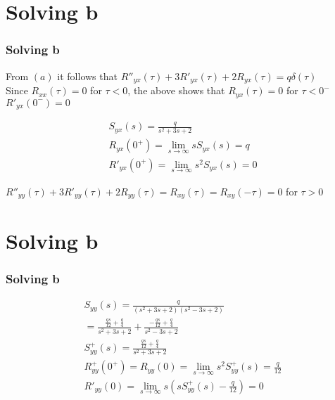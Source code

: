 \documentclass{beamer}
\providecommand{\brak}[1]{\ensuremath{\left(#1\right)}}
\begin{document}
\section{Solving b}
\begin{frame}
\frametitle{Solving b}

From \brak{a} it follows that 
$R''_{yx}\brak{\tau} + 3R'_{yx}\brak{\tau} + 2R_{yx}\brak{\tau} = q\delta\brak{\tau}$\\
Since $R_{xx}\brak{\tau} = 0$ for $\tau < 0$, the above shows that 
$R_{yx}\brak{\tau} = 0$ for $\tau < 0^{-}$ $R'_{yx}\brak{0^{-}} = 0$

\begin{align}
    S_{yx}\brak{s} = \frac{q}{s^{2} + 3s + 2}\\
R_{yx}\brak{0^{+}} = \lim\limits_{s \to \infty} s S_{yx}\brak{s} = q\\
R'_{yx}\brak{0^{+}} = \lim\limits_{s \to \infty} s^{2} S_{yx}\brak{s} = 0
\end{align}

$R''_{yy}\brak{\tau} + 3R'_{yy}\brak{\tau} + 2R_{yy}\brak{\tau} = R_{xy}\brak{\tau} = R_{xy}\brak{-\tau} = 0$ for $\tau > 0$

\end{frame}

\section{Solving b}
\begin{frame}
\frametitle{Solving b}
\begin{align}
    S_{yy}\brak{s} = \frac{q}{\brak{s^{2}+ 3s + 2}\brak{s^{2} - 3s + 2}}\\
    = \frac{\frac{qs}{12} + \frac{q}{4}}{s^{2} + 3s + 2} + \frac{-\frac{qs}{12} + \frac{q}{4}}{s^{2} - 3s + 2}\\
    S^{+}_{yy}\brak{s} = \frac{\frac{qs}{12} + \frac{q}{4}}{s^{2} + 3s + 2}\\
    R^{+}_{yy}\brak{0^{+}} = R_{yy}\brak{0} = \lim\limits_{s \to \infty} s^{2} S^{+}_{yy}\brak{s} =  \frac{q}{12}\\
    R'_{yy}\brak{0} = \lim\limits_{s \to \infty} s \brak{s S^{+}_{yy}\brak{s} - \frac{q}{12}} = 0 
\end{align}
\end{frame}
\end{document}
